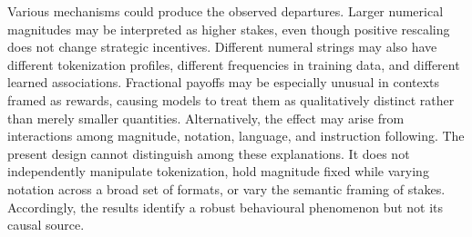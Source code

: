\documentclass[11pt,a4paper]{article}
\begin{document}
Various mechanisms could produce the observed departures. Larger numerical magnitudes may be interpreted as higher stakes, even though positive rescaling does not change strategic incentives. Different numeral strings may also have different tokenization profiles, different frequencies in training data, and different learned associations. 
Fractional payoffs may be especially unusual in contexts framed as rewards, causing models to treat them as qualitatively distinct rather than merely smaller quantities. Alternatively, the effect may arise from interactions among magnitude, notation, language, and instruction following. 
The present design cannot distinguish among these explanations. It does not independently manipulate tokenization, hold magnitude fixed while varying notation across a broad set of formats, or vary the semantic framing of stakes. Accordingly, the results identify a robust behavioural phenomenon but not its causal source.
\end{document}
